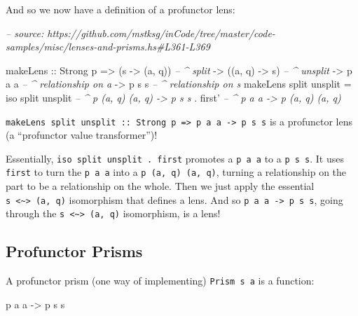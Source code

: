 \documentclass[]{article}
\newenvironment{Shaded}{}{}
\newcommand{\CommentTok}[1]{\textcolor[rgb]{0.38,0.63,0.69}{\textit{#1}}}
\newcommand{\DataTypeTok}[1]{\textcolor[rgb]{0.56,0.13,0.00}{#1}}
\newcommand{\FunctionTok}[1]{\textcolor[rgb]{0.02,0.16,0.49}{#1}}
\newcommand{\NormalTok}[1]{#1}
\newcommand{\OtherTok}[1]{\textcolor[rgb]{0.00,0.44,0.13}{#1}}
\begin{document}
And so we now have a definition of a profunctor lens:

\begin{Shaded}
\begin{Highlighting}[]
\CommentTok{-- source: https://github.com/mstksg/inCode/tree/master/code-samples/misc/lenses-and-prisms.hs#L361-L369}

\NormalTok{makeLens}
\OtherTok{    ::} \DataTypeTok{Strong}\NormalTok{ p}
    \OtherTok{=>}\NormalTok{ (s }\OtherTok{->}\NormalTok{ (a, q))        }\CommentTok{-- ^ split}
    \OtherTok{->}\NormalTok{ ((a, q) }\OtherTok{->}\NormalTok{ s)        }\CommentTok{-- ^ unsplit}
    \OtherTok{->}\NormalTok{ p a a                }\CommentTok{-- ^ relationship on a}
    \OtherTok{->}\NormalTok{ p s s                }\CommentTok{-- ^ relationship on s}
\NormalTok{makeLens split unsplit }\FunctionTok{=}
\NormalTok{    iso split unsplit  }\CommentTok{-- ^ p (a, q) (a, q) -> p s s}
  \FunctionTok{.}\NormalTok{ first'             }\CommentTok{-- ^ p a a -> p (a, q) (a, q)}
\end{Highlighting}
\end{Shaded}

\texttt{makeLens\ split\ unsplit\ ::\ Strong\ p\ =\textgreater{}\ p\ a\ a\ -\textgreater{}\ p\ s\ s}
is a profunctor lens (a ``profunctor value transformer'')!

Essentially, \texttt{iso\ split\ unsplit\ .\ first\textquotesingle{}} promotes a
\texttt{p\ a\ a} to a \texttt{p\ s\ s}. It uses \texttt{first\textquotesingle{}}
to turn the \texttt{p\ a\ a} into a \texttt{p\ (a,\ q)\ (a,\ q)}, turning a
relationship on the part to be a relationship on the whole. Then we just apply
the essential \texttt{s\ \textless{}\textasciitilde{}\textgreater{}\ (a,\ q)}
isomorphism that defines a lens. And so
\texttt{p\ a\ a\ -\textgreater{}\ p\ s\ s}, going through the
\texttt{s\ \textless{}\textasciitilde{}\textgreater{}\ (a,\ q)} isomorphism, is
a lens!

\hypertarget{profunctor-prisms}{%
\subsection{Profunctor Prisms}\label{profunctor-prisms}}

A profunctor prism (one way of implementing)
\texttt{Prism\textquotesingle{}\ s\ a} is a function:

\begin{Shaded}
\begin{Highlighting}[]
\NormalTok{p a a }\OtherTok{->}\NormalTok{ p s s}
\end{Highlighting}
\end{Shaded}
\end{document}
